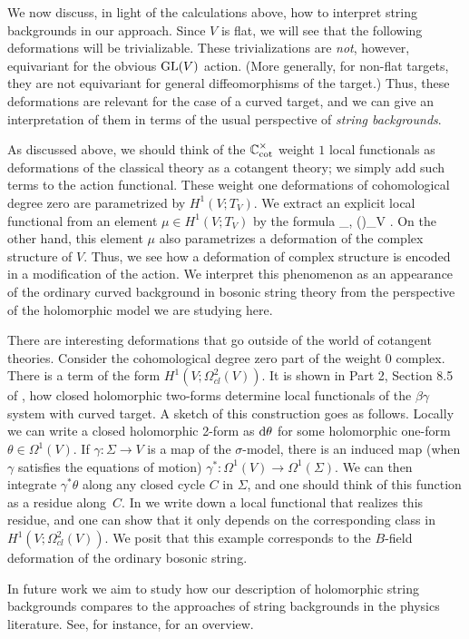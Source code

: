 We now discuss, in light of the calculations above, how to interpret string backgrounds in our approach. 
Since $V$ is flat,
we will see that the following deformations will be trivializable. 
These trivializations are {\em not}, however, equivariant for the obvious ${\rm GL}(V)$ action.
(More generally, for non-flat targets, they are not equivariant for general diffeomorphisms of the target.) 
Thus, these deformations are relevant for the case of a curved target, and we can give an interpretation of them in terms of the usual perspective of {\em string backgrounds}. 

As discussed above, we should think of the $\mathbb C^\times_{\rm cot}$ weight $1$ local functionals as deformations of the classical theory as a cotangent theory;
we simply add such terms to the action functional.
These weight one deformations of cohomological degree zero are parametrized by $H^1(V ; T_V)$. 
We extract an explicit local functional from an element $\mu \in H^1(V ; T_V)$
by the formula
\ben
\int_\Sigma \<\beta, \mu(\gamma)\>_V .
\een 
On the other hand, this element $\mu$ also parametrizes a deformation of the complex structure of $V$.
Thus, we see how a deformation of complex structure is encoded in a modification of the action. 
We interpret this phenomenon as an appearance of the ordinary curved background in bosonic string theory from the perspective of the holomorphic model we are studying here.

There are interesting deformations that go outside of the world of cotangent theories. 
Consider the cohomological degree zero part of the weight 0 complex. 
There is a term of the form $H^1(V ; \Omega^2_{cl}(V))$.
It is shown in Part 2, Section 8.5 of \cite{GGW}, 
how closed holomorphic two-forms determine local functionals of the $\beta\gamma$ system with curved target. 
A sketch of this construction goes as follows.
Locally we can write a closed holomorphic 2-form as ${\rm d} \theta$ for some holomorphic one-form $\theta \in \Omega^1(V)$. 
If $\gamma : \Sigma \to V$ is a map of the $\sigma$-model, 
there is an induced map (when $\gamma$ satisfies the equations of motion) $\gamma^* : \Omega^1(V) \to \Omega^1(\Sigma)$. 
We can then integrate $\gamma^* \theta$ along any closed cycle $C$ in $\Sigma$, 
and one should think of this function as a residue along~$C$. 
In \cite{GGW} we write down a local functional that realizes this residue, 
and one can show that it only depends on the corresponding class in $H^1(V ; \Omega^2_{cl}(V))$. 
We posit that this example corresponds to the $B$-field deformation of the ordinary bosonic string. 

In future work we aim to study how our description of holomorphic string backgrounds compares to the approaches of string backgrounds in the physics literature. 
See, for instance, \cite{CFMP} for an overview.


